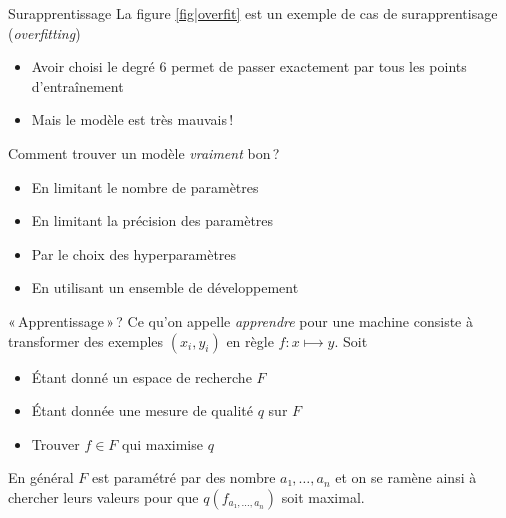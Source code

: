 \documentclass[hyperref={unicode}, xcolor={svgnames}, french]{beamer}
\begin{document}
\begin{frame}{Surapprentissage}
    La figure \ref{fig|overfit} est un exemple de cas de \alert{surapprentisage} (\emph{overfitting})
    \begin{itemize}
        \item Avoir choisi le degré $6$ permet de passer exactement par tous les points d'entraînement
        \item Mais le modèle est très mauvais !
    \end{itemize}
    Comment trouver un modèle \emph{vraiment} bon ?
    \begin{itemize}
        \item En limitant le nombre de paramètres
        \item En limitant la précision des paramètres
        \item Par le choix des hyperparamètres
        \item En utilisant un ensemble de développement
    \end{itemize}
\end{frame}


\begin{frame}{« Apprentissage » ?}
    Ce qu'on appelle \emph{apprendre} pour une machine consiste à transformer des exemples $(x_i, y_i)$ en règle $f: x⟼y$. Soit
    \begin{itemize}
        \item Étant donné un espace de recherche $F$
        \item Étant donnée une mesure de qualité $q$ sur $F$
        \item Trouver $f∈F$ qui maximise $q$
    \end{itemize}
    En général $F$ est paramétré par des nombre $a₁,…,a_n$ et on se ramène ainsi à chercher leurs valeurs pour que $q(f_{a₁,…,a_n})$ soit maximal.
\end{frame}
\end{document}
